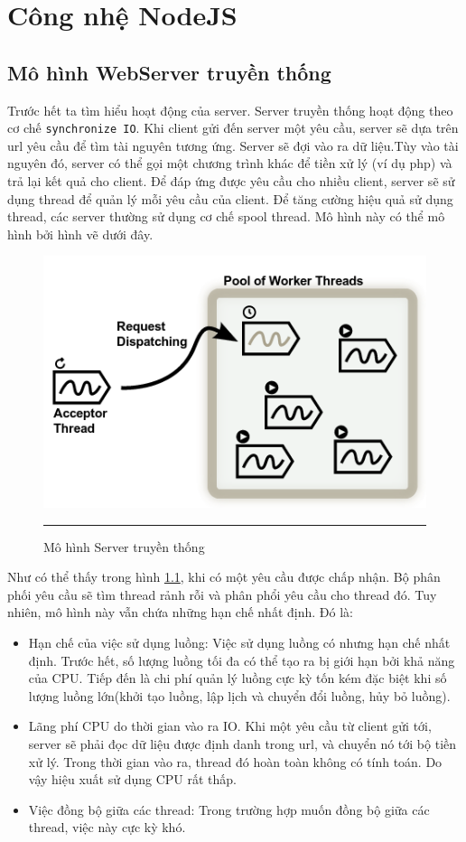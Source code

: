 ﻿\chapter{Công nhệ NodeJS}
\section{Mô hình WebServer truyền thống}
    Trước hết ta tìm hiểu hoạt động của server.  Server truyền thống hoạt động theo cơ chế \texttt{synchronize IO}. Khi client gửi đến server một yêu cầu, server sẽ dựa trên url yêu cầu để tìm tài nguyên tương ứng. Server sẽ đợi vào ra dữ liệu.Tùy vào tài nguyên đó, server có thể gọi một chương trình khác để tiền xử lý (ví dụ php) và trả lại kết quả cho client. Để đáp ứng được yêu cầu cho nhiều client, server sẽ sử dụng thread để quản lý mỗi yêu cầu của client. Để tăng cường hiệu quả sử dụng thread, các server thường sử dụng cơ chế spool thread. Mô hình này có thể mô hình bởi hình vẽ dưới đây. \\
	\begin{figure}
        \centering
        \includegraphics[scale=0.7]{io}
        \rule{35em}{0.5pt}
        \caption{Mô hình Server truyền thống}
        \label{fig:io}
    \end{figure}
	Như có thể thấy trong hình \ref{fig:io}, khi có một yêu cầu được chấp nhận. Bộ phân phối yêu cầu sẽ tìm thread rảnh rỗi và phân phổi yêu cầu cho thread đó.
	Tuy nhiên, mô hình này vẫn chứa những hạn chế nhất định. Đó là: \\
	\begin{itemize}
		\item Hạn chế của  việc sử dụng luồng: Việc sử dụng luồng có nhưng hạn chế nhất định. Trước hết, số lượng luồng tối đa có thể tạo ra bị giới hạn bởi khả năng của CPU. Tiếp đến là chi phí quản lý luồng cực kỳ tốn kém đặc biệt khi số lượng luồng lớn(khởi tạo luồng, lập lịch và chuyển đổi luồng, hủy bỏ luồng).
		\item Lãng phí CPU do thời gian vào ra IO. Khi một yêu cầu từ client gửi tới, server sẽ phải đọc dữ liệu được định danh trong url, và chuyển nó tới bộ tiền xử lý. Trong thời gian vào ra, thread đó hoàn toàn không có tính toán. Do vậy hiệu xuất sử dụng CPU rất thấp.
		\item Việc đồng bộ giữa các thread: Trong trường hợp  muốn đồng bộ giữa các thread, việc này cực kỳ khó.
	\end{itemize}

